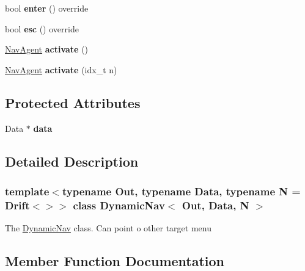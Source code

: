\begin{DoxyCompactItemize}
\mbox{\label{classDynamicNav_a1781e521f7d4e267f5e401c6070667b6}} 
bool {\bfseries enter} () override
\item 
\mbox{\label{classDynamicNav_abfa730037c5dd6f8902d5f76bba9121b}} 
bool {\bfseries esc} () override
\item 
\mbox{\label{classDynamicNav_a4c4a040f3705bf54d65514a3003733c8}} 
\hyperlink{structNavAgent}{Nav\+Agent} {\bfseries activate} ()
\item 
\mbox{\label{classDynamicNav_aac04efedd7e923981ac964878aff069f}} 
\hyperlink{structNavAgent}{Nav\+Agent} {\bfseries activate} (idx\+\_\+t n)
\end{DoxyCompactItemize}
\subsection*{Protected Attributes}
\begin{DoxyCompactItemize}
\item 
\mbox{\label{classDynamicNav_ae8525b309283d508cd2e36f78bd113f2}} 
Data $\ast$ {\bfseries data}
\end{DoxyCompactItemize}


\subsection{Detailed Description}
\subsubsection*{template$<$typename Out, typename Data, typename N = Drift$<$$>$$>$\newline
class Dynamic\+Nav$<$ Out, Data, N $>$}

The \hyperlink{classDynamicNav}{Dynamic\+Nav} class. Can point o other target menu 

\subsection{Member Function Documentation}
\mbox{\label{classDynamicNav_a13aab7546c1a57cd7d999b22be2f2364}} 
